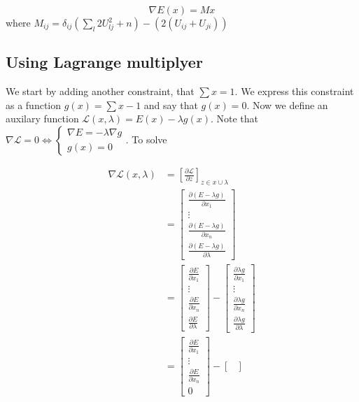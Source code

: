 \documentclass{article}
\begin{document}
$$ \nabla E(x) = Mx $$
where $M_{ij} = \delta_{ij}(\sum_l 2U_{lj}^2 + n) -(2(U_{ij} +U_{ji}))$

\subsection{Using Lagrange multiplyer}
We start by adding another constraint, that $\sum x = 1$. We express this
constraint as a function $g(x) = \sum x -1$ and say that $g(x) = 0$. Now we
define an auxilary function $\mathcal{L}(x, \lambda) = E(x) - \lambda
g(x)$. Note that $\nabla \mathcal{L} = 0 \Leftrightarrow
\begin{cases} 
\nabla E = - \lambda \nabla g \\
g(x) = 0
\end{cases}$. To solve 


\begin{align*}
\nabla \mathcal{L}(x, \lambda) &= [\frac{\partial \mathcal{L}}{\partial z}]_{z
\in x \cup \lambda} \\
&=
\begin{bmatrix}
	\frac{\partial (E - \lambda g)}{\partial x_1} \\
	\vdots \\
	\frac{\partial (E - \lambda g)}{\partial x_n} \\
	\frac{\partial (E - \lambda g)}{\partial \lambda}
\end{bmatrix} \\
&=
\begin{bmatrix}
	\frac{\partial E}{\partial x_1} \\
	\vdots \\
	\frac{\partial E}{\partial x_n} \\
	\frac{\partial E}{\partial \lambda}
\end{bmatrix} -
\begin{bmatrix}
	\frac{\partial \lambda g}{\partial x_1} \\
	\vdots \\
	\frac{\partial \lambda g}{\partial x_n} \\
	\frac{\partial \lambda g}{\partial \lambda}
\end{bmatrix} \\
&=
\begin{bmatrix}
	\frac{\partial E}{\partial x_1} \\
	\vdots \\
	\frac{\partial E}{\partial x_n} \\
	0
\end{bmatrix} - 
\begin{bmatrix}

\end{bmatrix}
\end{align*}
\end{document}
